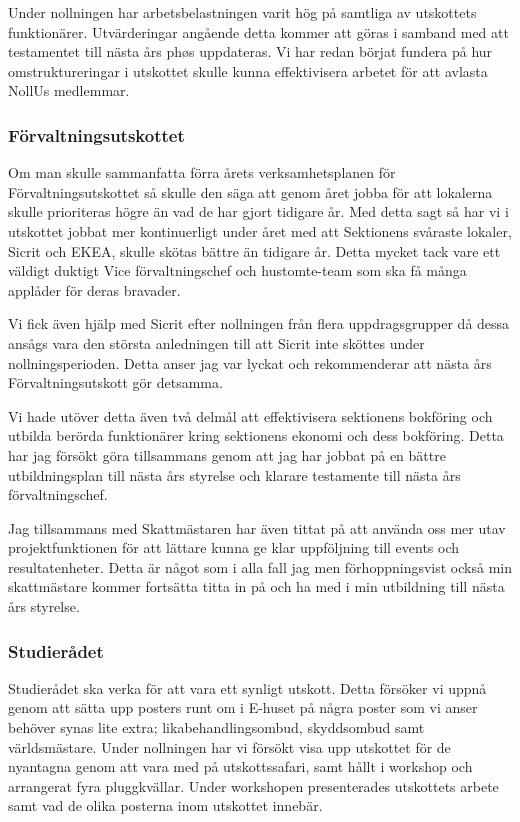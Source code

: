 \documentclass[../_main/handlingar.tex]{subfiles}
\begin{document}
Under nollningen har arbetsbelastningen varit hög på samtliga av utskottets funktionärer. Utvärderingar angående detta kommer att göras i samband med att testamentet till nästa års phøs uppdateras. Vi har redan börjat fundera på hur omstruktureringar i utskottet skulle kunna effektivisera arbetet för att avlasta NollUs medlemmar. 


\subsubsection*{Förvaltningsutskottet}

Om man skulle sammanfatta förra årets verksamhetsplanen för Förvaltningsutskottet så skulle den säga att genom året jobba för att lokalerna skulle prioriteras högre än vad de har gjort tidigare år. Med detta sagt så har vi i utskottet jobbat mer kontinuerligt under året med att Sektionens svåraste lokaler, Sicrit och EKEA, skulle skötas bättre än tidigare år. Detta mycket tack vare ett väldigt duktigt Vice förvaltningschef och hustomte-team som ska få många applåder för deras bravader. 

Vi fick även hjälp med Sicrit efter nollningen från flera uppdragsgrupper då dessa ansågs vara den största anledningen till att Sicrit inte sköttes under nollningsperioden. Detta anser jag var lyckat och rekommenderar att nästa års Förvaltningsutskott gör detsamma.

Vi hade utöver detta även två delmål att effektivisera sektionens bokföring och utbilda berörda funktionärer kring sektionens ekonomi och dess bokföring. Detta har jag försökt göra tillsammans genom att jag har jobbat på en bättre utbildningsplan till nästa års styrelse och klarare testamente till nästa års förvaltningschef. 

Jag tillsammans med Skattmästaren har även tittat på att använda oss mer utav projektfunktionen för att lättare kunna ge klar uppföljning till events och resultatenheter. Detta är något som i alla fall jag men förhoppningsvist också min skattmästare kommer fortsätta titta in på och ha med i min utbildning till nästa års styrelse.


\subsubsection*{Studierådet}

Studierådet ska verka för att vara ett synligt utskott. Detta försöker vi uppnå genom att sätta upp posters runt om i E-huset på några poster som vi anser behöver synas lite extra; likabehandlingsombud, skyddsombud samt världsmästare. Under nollningen har vi försökt visa upp utskottet för de nyantagna genom att vara med på utskottssafari, samt hållt i workshop och arrangerat fyra pluggkvällar. Under workshopen presenterades utskottets arbete samt vad de olika posterna inom utskottet innebär. 
\end{document}
